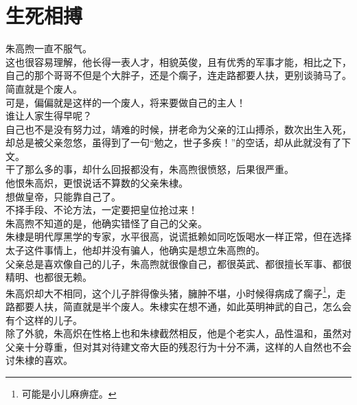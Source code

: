 \section{生死相搏}
\ifnum{}
	\begin{multicols}{\theparacolNo}
\fi
朱高煦一直不服气。\\

这也很容易理解，他长得一表人才，相貌英俊，且有优秀的军事才能，相比之下，自己的那个哥哥不但是个大胖子，还是个瘸子，连走路都要人扶，更别谈骑马了。\\

简直就是个废人。\\

可是，偏偏就是这样的一个废人，将来要做自己的主人！\\

谁让人家生得早呢？\\

自己也不是没有努力过，靖难的时候，拼老命为父亲的江山搏杀，数次出生入死，却总是被父亲忽悠，虽得到了一句“勉之，世子多疾！”的空话，却从此就没有了下文。\\

干了那么多的事，却什么回报都没有，朱高煦很愤怒，后果很严重。\\

他恨朱高炽，更恨说话不算数的父亲朱棣。\\

想做皇帝，只能靠自己了。\\

不择手段、不论方法，一定要把皇位抢过来！\\

朱高煦不知道的是，他确实错怪了自己的父亲。\\

朱棣是明代厚黑学的专家，水平很高，说谎抵赖如同吃饭喝水一样正常，但在选择太子这件事情上，他却并没有骗人，他确实是想立朱高煦的。\\

父亲总是喜欢像自己的儿子，朱高煦就很像自己，都很英武、都很擅长军事、都很精明、也都很无赖。\\

朱高炽却大不相同，这个儿子胖得像头猪，臃肿不堪，小时候得病成了瘸子\footnote{可能是小儿麻痹症。}，走路都要人扶，简直就是半个废人。朱棣实在想不通，如此英明神武的自己，怎么会有个这样的儿子。\\

除了外貌，朱高炽在性格上也和朱棣截然相反，他是个老实人，品性温和，虽然对父亲十分尊重，但对其对待建文帝大臣的残忍行为十分不满，这样的人自然也不会讨朱棣的喜欢。\\


\end{multicols}
